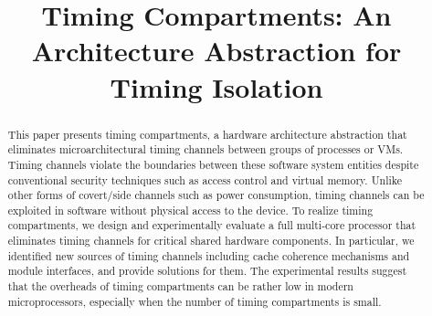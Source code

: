 \title{
    Timing Compartments: An Architecture Abstraction for Timing Isolation
}



\date{}
\maketitle

\thispagestyle{empty}

\begin{abstract}
    This paper presents timing compartments, a hardware architecture 
    abstraction 
    that eliminates microarchitectural timing channels between groups of 
    processes or VMs. Timing channels violate the boundaries between these 
    software system entities despite conventional security techniques such as 
    access control and virtual memory. Unlike other forms of covert/side channels such 
    as power consumption, timing channels can be exploited in software without 
    physical access to the device. 
    To realize timing 
    compartments, we design and experimentally evaluate a full multi-core 
    processor that eliminates timing channels for critical shared hardware 
    components. 
    In particular, we identified new sources of timing channels including
    cache coherence mechanisms and module interfaces, and provide solutions for them.
    The experimental results suggest that the overheads of
    timing compartments can be rather low in modern microprocessors, especially 
    when the number of timing compartments is small.

\end{abstract}
